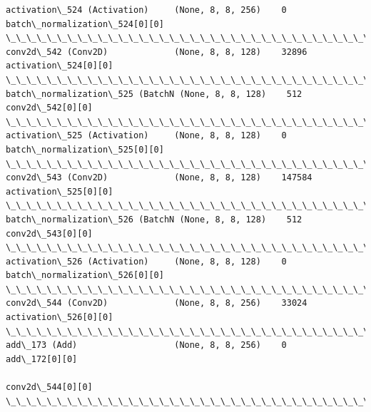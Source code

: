 \documentclass[11pt]{article}
\begin{document}
\begin{Verbatim}[commandchars=\\\{\}]
activation\_524 (Activation)     (None, 8, 8, 256)    0           batch\_normalization\_524[0][0]    
\_\_\_\_\_\_\_\_\_\_\_\_\_\_\_\_\_\_\_\_\_\_\_\_\_\_\_\_\_\_\_\_\_\_\_\_\_\_\_\_\_\_\_\_\_\_\_\_\_\_\_\_\_\_\_\_\_\_\_\_\_\_\_\_\_\_\_\_\_\_\_\_\_\_\_\_\_\_\_\_\_\_\_\_\_\_\_\_\_\_\_\_\_\_\_\_\_\_
conv2d\_542 (Conv2D)             (None, 8, 8, 128)    32896       activation\_524[0][0]             
\_\_\_\_\_\_\_\_\_\_\_\_\_\_\_\_\_\_\_\_\_\_\_\_\_\_\_\_\_\_\_\_\_\_\_\_\_\_\_\_\_\_\_\_\_\_\_\_\_\_\_\_\_\_\_\_\_\_\_\_\_\_\_\_\_\_\_\_\_\_\_\_\_\_\_\_\_\_\_\_\_\_\_\_\_\_\_\_\_\_\_\_\_\_\_\_\_\_
batch\_normalization\_525 (BatchN (None, 8, 8, 128)    512         conv2d\_542[0][0]                 
\_\_\_\_\_\_\_\_\_\_\_\_\_\_\_\_\_\_\_\_\_\_\_\_\_\_\_\_\_\_\_\_\_\_\_\_\_\_\_\_\_\_\_\_\_\_\_\_\_\_\_\_\_\_\_\_\_\_\_\_\_\_\_\_\_\_\_\_\_\_\_\_\_\_\_\_\_\_\_\_\_\_\_\_\_\_\_\_\_\_\_\_\_\_\_\_\_\_
activation\_525 (Activation)     (None, 8, 8, 128)    0           batch\_normalization\_525[0][0]    
\_\_\_\_\_\_\_\_\_\_\_\_\_\_\_\_\_\_\_\_\_\_\_\_\_\_\_\_\_\_\_\_\_\_\_\_\_\_\_\_\_\_\_\_\_\_\_\_\_\_\_\_\_\_\_\_\_\_\_\_\_\_\_\_\_\_\_\_\_\_\_\_\_\_\_\_\_\_\_\_\_\_\_\_\_\_\_\_\_\_\_\_\_\_\_\_\_\_
conv2d\_543 (Conv2D)             (None, 8, 8, 128)    147584      activation\_525[0][0]             
\_\_\_\_\_\_\_\_\_\_\_\_\_\_\_\_\_\_\_\_\_\_\_\_\_\_\_\_\_\_\_\_\_\_\_\_\_\_\_\_\_\_\_\_\_\_\_\_\_\_\_\_\_\_\_\_\_\_\_\_\_\_\_\_\_\_\_\_\_\_\_\_\_\_\_\_\_\_\_\_\_\_\_\_\_\_\_\_\_\_\_\_\_\_\_\_\_\_
batch\_normalization\_526 (BatchN (None, 8, 8, 128)    512         conv2d\_543[0][0]                 
\_\_\_\_\_\_\_\_\_\_\_\_\_\_\_\_\_\_\_\_\_\_\_\_\_\_\_\_\_\_\_\_\_\_\_\_\_\_\_\_\_\_\_\_\_\_\_\_\_\_\_\_\_\_\_\_\_\_\_\_\_\_\_\_\_\_\_\_\_\_\_\_\_\_\_\_\_\_\_\_\_\_\_\_\_\_\_\_\_\_\_\_\_\_\_\_\_\_
activation\_526 (Activation)     (None, 8, 8, 128)    0           batch\_normalization\_526[0][0]    
\_\_\_\_\_\_\_\_\_\_\_\_\_\_\_\_\_\_\_\_\_\_\_\_\_\_\_\_\_\_\_\_\_\_\_\_\_\_\_\_\_\_\_\_\_\_\_\_\_\_\_\_\_\_\_\_\_\_\_\_\_\_\_\_\_\_\_\_\_\_\_\_\_\_\_\_\_\_\_\_\_\_\_\_\_\_\_\_\_\_\_\_\_\_\_\_\_\_
conv2d\_544 (Conv2D)             (None, 8, 8, 256)    33024       activation\_526[0][0]             
\_\_\_\_\_\_\_\_\_\_\_\_\_\_\_\_\_\_\_\_\_\_\_\_\_\_\_\_\_\_\_\_\_\_\_\_\_\_\_\_\_\_\_\_\_\_\_\_\_\_\_\_\_\_\_\_\_\_\_\_\_\_\_\_\_\_\_\_\_\_\_\_\_\_\_\_\_\_\_\_\_\_\_\_\_\_\_\_\_\_\_\_\_\_\_\_\_\_
add\_173 (Add)                   (None, 8, 8, 256)    0           add\_172[0][0]                    
                                                                 conv2d\_544[0][0]                 
\_\_\_\_\_\_\_\_\_\_\_\_\_\_\_\_\_\_\_\_\_\_\_\_\_\_\_\_\_\_\_\_\_\_\_\_\_\_\_\_\_\_\_\_\_\_\_\_\_\_\_\_\_\_\_\_\_\_\_\_\_\_\_\_\_\_\_\_\_\_\_\_\_\_\_\_\_\_\_\_\_\_\_\_\_\_\_\_\_\_\_\_\_\_\_\_\_\_

\end{Verbatim}
\end{document}
